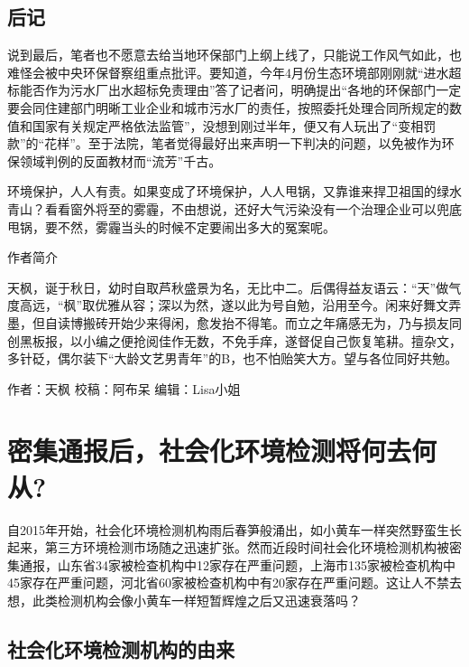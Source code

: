 \documentclass[]{book}
\begin{document}
\hypertarget{ux540eux8bb0-3}{%
\subsection{后记}\label{ux540eux8bb0-3}}

说到最后，笔者也不愿意去给当地环保部门上纲上线了，只能说工作风气如此，也难怪会被中央环保督察组重点批评。要知道，今年4月份生态环境部刚刚就``进水超标能否作为污水厂出水超标免责理由''答了记者问，明确提出``各地的环保部门一定要会同住建部门明晰工业企业和城市污水厂的责任，按照委托处理合同所规定的数值和国家有关规定严格依法监管''，没想到刚过半年，便又有人玩出了``变相罚款''的``花样''。至于法院，笔者觉得最好出来声明一下判决的问题，以免被作为环保领域判例的反面教材而``流芳''千古。

环境保护，人人有责。如果变成了环境保护，人人甩锅，又靠谁来捍卫祖国的绿水青山？看看窗外将至的雾霾，不由想说，还好大气污染没有一个治理企业可以兜底甩锅，要不然，雾霾当头的时候不定要闹出多大的冤案呢。

作者简介

天枫，诞于秋日，幼时自取芦秋盛景为名，无比中二。后偶得益友语云：``天''做气度高远，``枫''取优雅从容；深以为然，遂以此为号自勉，沿用至今。闲来好舞文弄墨，但自读博搬砖开始少来得闲，愈发抬不得笔。而立之年痛感无为，乃与损友同创黑板报，以小编之便抢阅佳作无数，不免手痒，遂督促自己恢复笔耕。擅杂文，多针砭，偶尔装下``大龄文艺男青年''的B，也不怕贻笑大方。望与各位同好共勉。

作者：天枫
校稿：阿布呆
编辑：Lisa小姐

\hypertarget{ux5bc6ux96c6ux901aux62a5ux540eux793eux4f1aux5316ux73afux5883ux68c0ux6d4bux5c06ux4f55ux53bbux4f55ux4ece}{%
\section{密集通报后，社会化环境检测将何去何从?}\label{ux5bc6ux96c6ux901aux62a5ux540eux793eux4f1aux5316ux73afux5883ux68c0ux6d4bux5c06ux4f55ux53bbux4f55ux4ece}}

自2015年开始，社会化环境检测机构雨后春笋般涌出，如小黄车一样突然野蛮生长起来，第三方环境检测市场随之迅速扩张。然而近段时间社会化环境检测机构被密集通报，山东省34家被检查机构中12家存在严重问题，上海市135家被检查机构中45家存在严重问题，河北省60家被检查机构中有20家存在严重问题。这让人不禁去想，此类检测机构会像小黄车一样短暂辉煌之后又迅速衰落吗？

\hypertarget{ux793eux4f1aux5316ux73afux5883ux68c0ux6d4bux673aux6784ux7684ux7531ux6765}{%
\subsection{社会化环境检测机构的由来}\label{ux793eux4f1aux5316ux73afux5883ux68c0ux6d4bux673aux6784ux7684ux7531ux6765}}
\end{document}
